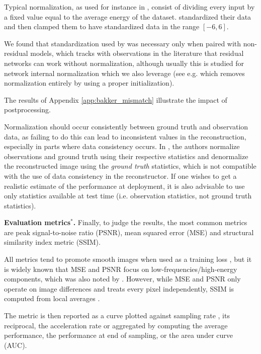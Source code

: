 Typical normalization, as used for instance in \cite{pineda2020active}, consist of dividing every input by a fixed value equal to the average energy of the dataset. \cite{bakker2020experimental} standardized their data and then clamped them to have standardized data in the range $[-6,6]$.

We found that standardization used by \cite{bakker2020experimental} was necessary only when paired with non-residual models, which tracks with observations in the literature that residual networks can work without normalization, although usually this is studied for network internal normalization which we also leverage (see e.g. \cite{zhangFixupInitializationResidual2018} which removes normalization entirely by using a proper initialization).

The results of Appendix \ref{app:bakker_mismatch} illustrate the impact of postprocessing.

\begin{extremark}[Caveat \#2]
 Normalization should occur consistently between ground truth and observation data, as failing to do this can lead to inconsistent values in the reconstruction, especially in parts where data consistency occurs. In \cite{bakker2020experimental}, the authors normalize observations and ground truth using their respective statistics and denormalize the reconstructed image using the \textit{ground truth} statistics, which is not compatible with the use of data consistency in the reconstructor. If one wishes to get a realistic estimate of the performance at deployment, it is also advisable to use only statistics available at test time (i.e. observation statistics, not ground truth statistics).
\end{extremark}

\textbf{Evaluation metrics$^*$.}
Finally, to judge the results, the most common metrics are peak signal-to-noise ratio (PSNR), mean squared error (MSE) and structural similarity index metric (SSIM).

All metrics tend to promote smooth images when used as a training loss \citep{muckleyStateoftheArtMachineLearning2020}, but it is widely known that MSE and PSNR focus on low-frequencies/high-energy components, which was also noted by \citet{bakker2020experimental}. However, while MSE and PSNR only operate on image differences and treats every pixel independently, SSIM is computed from local averages \citep{wang2004image,zbontarFastMRIOpenDataset2019}.

The metric is then reported as a curve plotted against sampling rate \citep{zhang2019reducing}, its reciprocal, the acceleration rate \citep{pineda2020active} or aggregated by computing the average performance, the performance at end of sampling, or the area under curve (AUC). 

